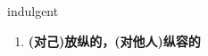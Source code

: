 
\begin{frame}
{\huge indulgent}
\begin{center}
\begin{enumerate}\Large
  \item \textbf{(对己)放纵的，(对他人)纵容的}
\end{enumerate}
\end{center}
\end{frame}
